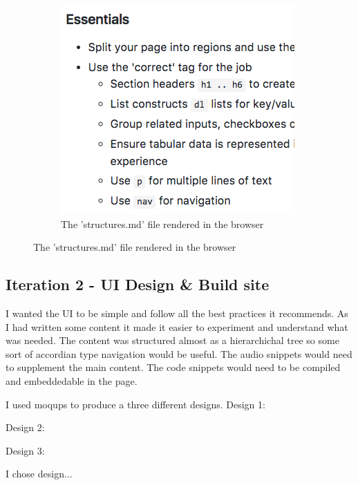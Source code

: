 \begin{figure}[H]
\begin{subfigure}[b]{0.4\textwidth}
        \includegraphics[width=\textwidth]{figures/documentation_md_example_2}
        \captionsetup{justification=centering}
        \caption{The 'structures.md' file rendered in the browser}
        \label{fig:structures}
    \end{subfigure}
\end{figure}

\subsection{Iteration 2 - UI Design \& Build site}
I wanted the UI to be simple and follow all the best practices it recommends.
As I had written some content it made it easier to experiment and understand
what was needed. The content was structured almost as a hierarchichal tree so
some sort of accordian type navigation would be useful. The audio snippets
would need to supplement the main content. The code snippets
would need to be compiled and embeddedable in the page.

I used moqups to produce a three different designs.
Design 1:

Design 2:

Design 3:

I chose design...

